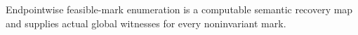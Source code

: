 Endpointwise feasible-mark enumeration is a computable semantic recovery map and supplies actual global witnesses for every noninvariant mark.